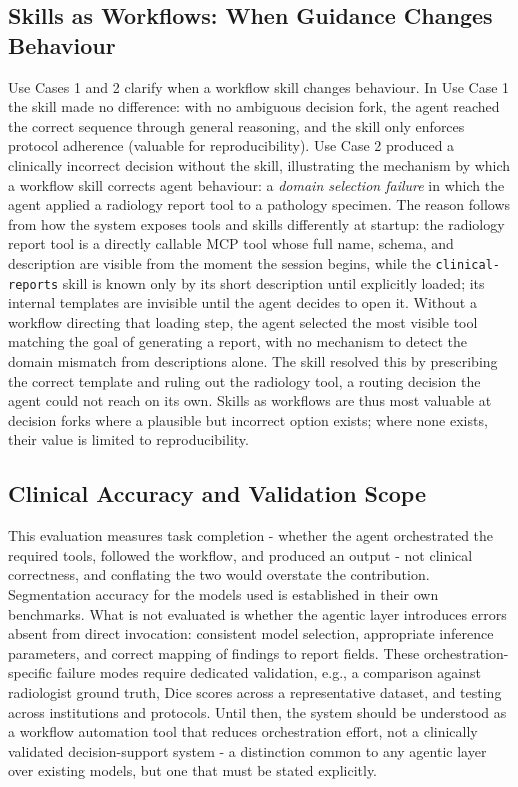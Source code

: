 \documentclass[1p,12pt]{elsarticle}
\begin{document}
\subsection{Skills as Workflows: When Guidance Changes Behaviour}
Use Cases 1 and 2 clarify when a workflow skill changes behaviour. In Use Case 1 the skill made no difference: with no ambiguous decision fork, the agent reached the correct sequence through general reasoning, and the skill only enforces protocol adherence (valuable for reproducibility). Use Case 2 produced a clinically incorrect decision without the skill, illustrating the mechanism by which a workflow skill corrects agent behaviour: a \emph{domain selection failure} in which the agent applied a radiology report tool to a pathology specimen. The reason follows from how the system exposes tools and skills differently at startup: the radiology report tool is a directly callable MCP tool whose full name, schema, and description are visible from the moment the session begins, while the \texttt{clinical-reports} skill is known only by its short description until explicitly loaded; its internal templates are invisible until the agent decides to open it. Without a workflow directing that loading step, the agent selected the most visible tool matching the goal of generating a report, with no mechanism to detect the domain mismatch from descriptions alone. The skill resolved this by prescribing the correct template and ruling out the radiology tool, a routing decision the agent could not reach on its own. Skills as workflows are thus most valuable at decision forks where a plausible but incorrect option exists; where none exists, their value is limited to reproducibility.

\subsection{Clinical Accuracy and Validation Scope}
This evaluation measures task completion - whether the agent orchestrated the required tools, followed the workflow, and produced an output - not clinical correctness, and conflating the two would overstate the contribution. Segmentation accuracy for the models used is established in their own benchmarks. What is not evaluated is whether the agentic layer introduces errors absent from direct invocation: consistent model selection, appropriate inference parameters, and correct mapping of findings to report fields. These orchestration-specific failure modes require dedicated validation, e.g., a comparison against radiologist ground truth, Dice scores across a representative dataset, and testing across institutions and protocols. Until then, the system should be understood as a workflow automation tool that reduces orchestration effort, not a clinically validated decision-support system - a distinction common to any agentic layer over existing models, but one that must be stated explicitly.
\end{document}
